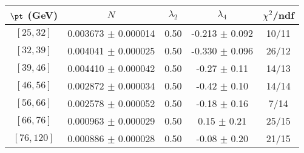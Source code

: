\begin{tabular}{c||c|c|c|c}
$\pt$ (GeV) & $N$ & $\lambda_{2}$ & $\lambda_4$  & $\chi^2$/ndf  \\
\hline
$[25, 32]$ & 0.003673 $\pm$ 0.000014 & 0.50 & -0.213 $\pm$ 0.092 & 10/11\\
$[32, 39]$ & 0.004041 $\pm$ 0.000025 & 0.50 & -0.330 $\pm$ 0.096 & 26/12\\
$[39, 46]$ & 0.004410 $\pm$ 0.000042 & 0.50 & -0.27 $\pm$ 0.11 & 14/13\\
$[46, 56]$ & 0.002872 $\pm$ 0.000034 & 0.50 & -0.42 $\pm$ 0.10 & 14/14\\
$[56, 66]$ & 0.002578 $\pm$ 0.000052 & 0.50 & -0.18 $\pm$ 0.16 & 7/14\\
$[66, 76]$ & 0.000963 $\pm$ 0.000029 & 0.50 & 0.15 $\pm$ 0.21 & 25/15\\
$[76, 120]$ & 0.000886 $\pm$ 0.000028 & 0.50 & -0.08 $\pm$ 0.20 & 21/15\\
\end{tabular}

